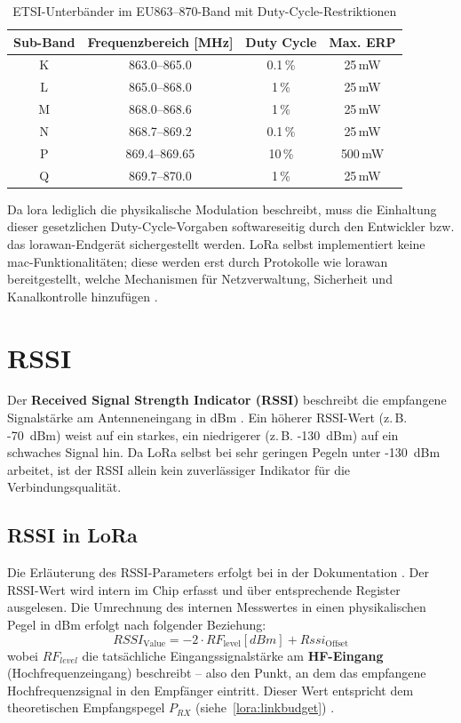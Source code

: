 	\begin{table}[H]
		\centering
		\begin{tabular}{|c|c|c|c|}
			\hline
			\textbf{Sub-Band} & \textbf{Frequenzbereich [MHz]} & \textbf{Duty Cycle} & \textbf{Max. ERP} \\
			\hline
			K & 863.0--865.0   & 0.1\,\%  & 25\,mW \\
			\hline
			L & 865.0--868.0   & 1\,\%    & 25\,mW \\
			\hline
			M & 868.0--868.6   & 1\,\%    & 25\,mW \\
			\hline
			N & 868.7--869.2   & 0.1\,\%  & 25\,mW \\
			\hline
			P & 869.4--869.65  & 10\,\%   & 500\,mW \\
			\hline
			Q & 869.7--870.0   & 1\,\%    & 25\,mW \\
			\hline
		\end{tabular}
		\caption{ETSI-Unterbänder im EU863--870-Band mit Duty-Cycle-Restriktionen 
			\cite{ETSI:2018b}}
	\end{table}


	Da \ac{lora} lediglich die physikalische Modulation beschreibt, muss die Einhaltung dieser gesetzlichen Duty-Cycle-Vorgaben softwareseitig durch den Entwickler bzw. das \ac{lorawan}-Endgerät sichergestellt werden. LoRa selbst implementiert keine \ac{mac}-Funktionalitäten; diese werden erst durch Protokolle wie \ac{lorawan} bereitgestellt, welche Mechanismen für Netzverwaltung, Sicherheit und Kanalkontrolle hinzufügen \cite{Montagny:2022, Semtech:2015}.

	
	
\section{RSSI}

	Der \textbf{Received Signal Strength Indicator (RSSI)} beschreibt die empfangene Signalstärke am Antenneneingang in dBm \cite{Hendricks:2024}. Ein höherer RSSI-Wert (z.\,B. -70~dBm) weist auf ein starkes, ein niedrigerer (z.\,B. -130~dBm) auf ein schwaches Signal hin. 
	Da LoRa selbst bei sehr geringen Pegeln unter -130~dBm arbeitet, ist der RSSI allein kein zuverlässiger Indikator für die Verbindungsqualität.
	
	

\subsection{RSSI in LoRa}
	Die Erläuterung des RSSI-Parameters erfolgt bei \citeauthor{Semtech:2015b} in der Dokumentation  \cite{Semtech:2015b}.
	Der RSSI-Wert wird intern im Chip erfasst und über entsprechende Register ausgelesen.
	Die Umrechnung des internen Messwertes in einen physikalischen Pegel in dBm erfolgt nach folgender Beziehung:
	\[
	RSSI_{\text{Value}}= -2 \cdot RF_{\text{level}}[dBm] + Rssi_{\text{Offset}}
	\]
	wobei \(RF_{level}\) die tatsächliche Eingangssignalstärke am \textbf{HF-Eingang} (Hochfrequenzeingang) beschreibt – also den Punkt, an dem das empfangene Hochfrequenzsignal in den Empfänger eintritt. 
	Dieser Wert entspricht dem theoretischen Empfangspegel \(P_{RX}\) (siehe~\ref{lora:linkbudget}) . 
	
